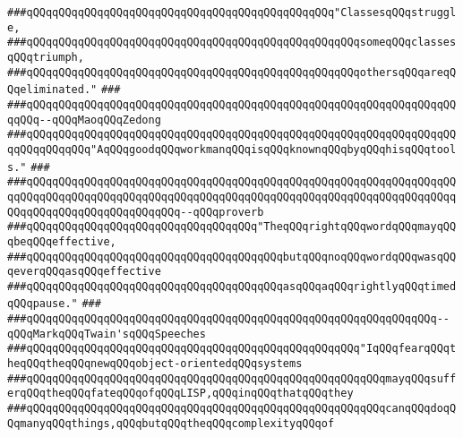 \newline
\newline
\newline
\verb|###qQQqqQQqqQQqqQQqqQQqqQQqqQQqqQQqqQQqqQQqqQQqqQQq"ClassesqQQqstruggle,|\newline
\verb|###qQQqqQQqqQQqqQQqqQQqqQQqqQQqqQQqqQQqqQQqqQQqqQQqqQQqsomeqQQqclassesqQQqtriumph,|\newline
\verb|###qQQqqQQqqQQqqQQqqQQqqQQqqQQqqQQqqQQqqQQqqQQqqQQqqQQqothersqQQqareqQQqeliminated."|\newline
\verb|###|\newline
\verb|###qQQqqQQqqQQqqQQqqQQqqQQqqQQqqQQqqQQqqQQqqQQqqQQqqQQqqQQqqQQqqQQqqQQqqQQq--qQQqMaoqQQqZedong|\newline
\newline
\newline
\verb|###qQQqqQQqqQQqqQQqqQQqqQQqqQQqqQQqqQQqqQQqqQQqqQQqqQQqqQQqqQQqqQQqqQQqqQQqqQQqqQQq"AqQQqgoodqQQqworkmanqQQqisqQQqknownqQQqbyqQQqhisqQQqtools."|\newline
\verb|###|\newline
\verb|###qQQqqQQqqQQqqQQqqQQqqQQqqQQqqQQqqQQqqQQqqQQqqQQqqQQqqQQqqQQqqQQqqQQqqQQqqQQqqQQqqQQqqQQqqQQqqQQqqQQqqQQqqQQqqQQqqQQqqQQqqQQqqQQqqQQqqQQqqQQqqQQqqQQqqQQqqQQqqQQqqQQq--qQQqproverb|\newline
\newline
\newline
\verb|###qQQqqQQqqQQqqQQqqQQqqQQqqQQqqQQqqQQq"TheqQQqrightqQQqwordqQQqmayqQQqbeqQQqeffective,|\newline
\verb|###qQQqqQQqqQQqqQQqqQQqqQQqqQQqqQQqqQQqqQQqbutqQQqnoqQQqwordqQQqwasqQQqeverqQQqasqQQqeffective|\newline
\verb|###qQQqqQQqqQQqqQQqqQQqqQQqqQQqqQQqqQQqqQQqasqQQqaqQQqrightlyqQQqtimedqQQqpause."|\newline
\verb|###|\newline
\verb|###qQQqqQQqqQQqqQQqqQQqqQQqqQQqqQQqqQQqqQQqqQQqqQQqqQQqqQQqqQQqqQQq--qQQqMarkqQQqTwain'sqQQqSpeeches|\newline
\newline
\newline
\newline
\verb|###qQQqqQQqqQQqqQQqqQQqqQQqqQQqqQQqqQQqqQQqqQQqqQQqqQQq"IqQQqfearqQQqtheqQQqtheqQQqnewqQQqobject-orientedqQQqsystems|\newline
\verb|###qQQqqQQqqQQqqQQqqQQqqQQqqQQqqQQqqQQqqQQqqQQqqQQqqQQqqQQqmayqQQqsufferqQQqtheqQQqfateqQQqofqQQqLISP,qQQqinqQQqthatqQQqthey|\newline
\verb|###qQQqqQQqqQQqqQQqqQQqqQQqqQQqqQQqqQQqqQQqqQQqqQQqqQQqqQQqcanqQQqdoqQQqmanyqQQqthings,qQQqbutqQQqtheqQQqcomplexityqQQqof|\newline
